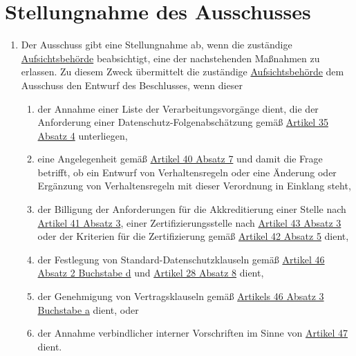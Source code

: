 \chapter{Stellungnahme des Ausschusses}
\label{ch:64}


\begin{enumerate}

  \item Der Ausschuss gibt eine Stellungnahme ab, wenn die zuständige \hyperref[itm:04-21]
   {Aufsichtsbehörde} beabsichtigt, eine der nachstehenden Maßnahmen zu erlassen. Zu diesem Zweck übermittelt die
   zuständige \hyperref[itm:04-21]{Aufsichtsbehörde} dem Ausschuss den Entwurf des Beschlusses, wenn dieser%
  \label{itm:64-1}

  \begin{enumerate}
  
    \item der Annahme einer Liste der Verarbeitungsvorgänge dient, die der Anforderung einer
     Datenschutz-Folgenabschätzung gemäß \hyperref[itm:35-4]{Artikel 35 Absatz 4} unterliegen,%
    \label{itm:64-1a}

    \item eine Angelegenheit gemäß \hyperref[itm:40-7]{Artikel 40 Absatz 7} und damit die Frage betrifft, ob ein Entwurf
     von Verhaltensregeln oder eine Änderung oder Ergänzung von Verhaltensregeln mit dieser Verordnung in Einklang
     steht,%
    \label{itm:64-1b}

    \item der Billigung der Anforderungen für die Akkreditierung einer Stelle nach \hyperref[itm:41-3]{Artikel 41 Absatz
     3}, einer Zertifizierungsstelle nach \hyperref[itm:43-3]{Artikel 43 Absatz 3} oder der Kriterien für die
     Zertifizierung gemäß \hyperref[itm:42-5]{Artikel 42 Absatz 5} dient,%
    \label{itm:64-1c}

    \item der Festlegung von Standard-Datenschutzklauseln gemäß \hyperref[itm:46-2d]{Artikel 46 Absatz 2 Buchstabe d}
     und \hyperref[itm:28-8]{Artikel 28 Absatz 8} dient,%
    \label{itm:64-1d}

    \item der Genehmigung von Vertragsklauseln gemäß \hyperref[itm:46-3a]{Artikels 46 Absatz 3 Buchstabe a} dient, oder%
    \label{itm:64-1e}

    \item der Annahme verbindlicher interner Vorschriften im Sinne von \hyperref[ch:47]{Artikel 47} dient.%
    \label{itm:64-1f}


\end{enumerate}
\end{enumerate}
